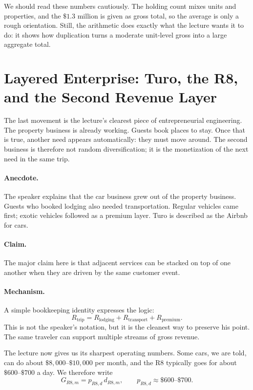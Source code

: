 We should read these numbers cautiously. The holding count mixes units and properties, and the \(\$1.3\) million is given as gross total, so the average is only a rough orientation. Still, the arithmetic does exactly what the lecture wants it to do: it shows how duplication turns a moderate unit-level gross into a large aggregate total.

\section{Layered Enterprise: Turo, the R8, and the Second Revenue Layer}

The last movement is the lecture's clearest piece of entrepreneurial engineering. The property business is already working. Guests book places to stay. Once that is true, another need appears automatically: they must move around. The second business is therefore not random diversification; it is the monetization of the next need in the same trip.

\paragraph{Anecdote.}
The speaker explains that the car business grew out of the property business. Guests who booked lodging also needed transportation. Regular vehicles came first; exotic vehicles followed as a premium layer. Turo is described as the Airbnb for cars.

\paragraph{Claim.}
The major claim here is that adjacent services can be stacked on top of one another when they are driven by the same customer event.

\paragraph{Mechanism.}
A simple bookkeeping identity expresses the logic:
\begin{equation}
R_{\mathrm{trip}}
=
R_{\mathrm{lodging}}
+
R_{\mathrm{transport}}
+
R_{\mathrm{premium}}.
\end{equation}
This is not the speaker's notation, but it is the cleanest way to preserve his point. The same traveler can support multiple streams of gross revenue.

The lecture now gives us its sharpest operating numbers. Some cars, we are told, can do about \(\$8{,}000\text{--}\$10{,}000\) per month, and the R8 typically goes for about \(\$600\text{--}\$700\) a day. We therefore write
\begin{equation}
G_{R8,m}=p_{R8,d}\,d_{R8,m},
\qquad
p_{R8,d}\approx \$600\text{--}\$700.
\end{equation}

